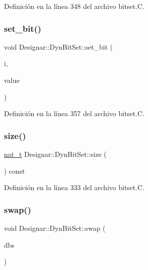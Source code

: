 Definición en la línea 348 del archivo bitset.\+C.

\mbox{\label{class_designar_1_1_dyn_bit_set_a3f9dc7630c5c25c85dffc260f3feccb3}} 
\subsubsection{\texorpdfstring{set\+\_\+bit()}{set\_bit()}}
{\footnotesize\ttfamily void Designar\+::\+Dyn\+Bit\+Set\+::set\+\_\+bit (\begin{DoxyParamCaption}\item[{\hyperlink{namespace_designar_aa72662848b9f4815e7bf31a7cf3e33d1}{nat\+\_\+t}}]{i,  }\item[{bool}]{value }\end{DoxyParamCaption})}



Definición en la línea 357 del archivo bitset.\+C.

\mbox{\label{class_designar_1_1_dyn_bit_set_a0107a8946533f6b8dc9a225a2f5b91a9}} 
\subsubsection{\texorpdfstring{size()}{size()}}
{\footnotesize\ttfamily \hyperlink{namespace_designar_aa72662848b9f4815e7bf31a7cf3e33d1}{nat\+\_\+t} Designar\+::\+Dyn\+Bit\+Set\+::size (\begin{DoxyParamCaption}{ }\end{DoxyParamCaption}) const}



Definición en la línea 333 del archivo bitset.\+C.

\mbox{\label{class_designar_1_1_dyn_bit_set_a376fe3b34a2a0c93bde8f33ff2947e64}} 
\subsubsection{\texorpdfstring{swap()}{swap()}}
{\footnotesize\ttfamily void Designar\+::\+Dyn\+Bit\+Set\+::swap (\begin{DoxyParamCaption}\item[{\hyperlink{class_designar_1_1_dyn_bit_set}{Dyn\+Bit\+Set} \&}]{dbs }\end{DoxyParamCaption})}




